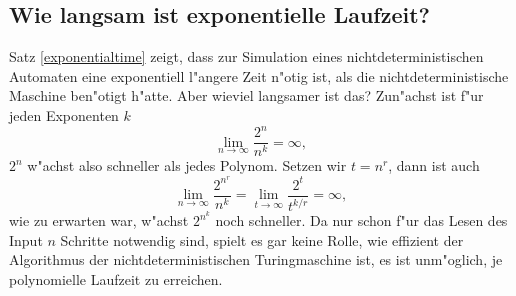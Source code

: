 \subsection{Wie langsam ist exponentielle Laufzeit?}
Satz \ref{exponentialtime} zeigt, dass zur Simulation eines
nichtdeterministischen Automaten eine exponentiell l"angere
Zeit n"otig ist, als die nichtdeterministische Maschine
ben"otigt h"atte. Aber wieviel langsamer ist das?
Zun"achst ist f"ur jeden Exponenten $k$
\[
\lim_{n\to\infty}\frac{2^{n}}{n^k}=\infty,
\]
$2^n$ w"achst also schneller als jedes Polynom. 
Setzen wir $t=n^r$, dann ist auch
\[
\lim_{n\to\infty}\frac{2^{n^r}}{n^k}
=
\lim_{t\to\infty}\frac{2^t}{t^{k/r}}
=
\infty,
\]
wie zu erwarten war, w"achst $2^{n^k}$ noch schneller.
Da nur schon f"ur das Lesen des Input $n$ Schritte notwendig sind,
spielt es gar keine Rolle, wie effizient der Algorithmus der
nichtdeterministischen Turingmaschine ist, es ist unm"oglich,
je polynomielle Laufzeit zu erreichen.

